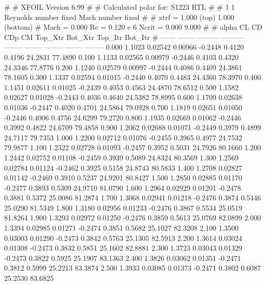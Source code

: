 #  
#       XFOIL         Version 6.99
#  
# Calculated polar for: S1223 RTL                                       
#  
# 1 1 Reynolds number fixed          Mach number fixed         
#  
# xtrf =   1.000 (top)        1.000 (bottom)  
# Mach =   0.000     Re =     0.120 e 6     Ncrit =   9.000  9.000
#  
#   alpha    CL        CD       CDp       CM     Top_Xtr  Bot_Xtr  Top_Itr  Bot_Itr
#  ------ -------- --------- --------- -------- -------- -------- -------- --------
   0.000   1.1023   0.02542   0.00966  -0.2448   0.4120   0.4196  24.2831  77.4890
   0.100   1.1133   0.02565   0.00979  -0.2446   0.4103   0.4320  24.3346  77.8776
   0.200   1.1240   0.02579   0.00997  -0.2444   0.4086   0.4409  24.3861  78.1605
   0.300   1.1337   0.02594   0.01015  -0.2440   0.4070   0.4483  24.4360  78.3970
   0.400   1.1451   0.02611   0.01025  -0.2439   0.4053   0.4563  24.4870  78.6512
   0.500   1.1582   0.02627   0.01028  -0.2443   0.4036   0.4640  24.5382  78.8995
   0.600   1.1709   0.02638   0.01036  -0.2447   0.4020   0.4701  24.5864  79.0928
   0.700   1.1819   0.02651   0.01050  -0.2446   0.4006   0.4756  24.6299  79.2720
   0.800   1.1935   0.02669   0.01062  -0.2446   0.3992   0.4822  24.6709  79.4858
   0.900   1.2062   0.02688   0.01071  -0.2449   0.3979   0.4899  24.7117  79.7353
   1.000   1.2200   0.02712   0.01076  -0.2455   0.3965   0.4977  24.7532  79.9877
   1.100   1.2322   0.02728   0.01093  -0.2457   0.3952   0.5031  24.7926  80.1660
   1.200   1.2442   0.02752   0.01108  -0.2459   0.3939   0.5089  24.8324  80.3569
   1.300   1.2569   0.02784   0.01124  -0.2462   0.3925   0.5158  24.8743  80.5833
   1.400   1.2708   0.02827   0.01142  -0.2469   0.3910   0.5237  24.9201  80.8427
   1.500   1.2850   0.02885   0.01170  -0.2477   0.3893   0.5309  24.9710  81.0790
   1.600   1.2964   0.02929   0.01201  -0.2478   0.3881   0.5372  25.0086  81.2874
   1.700   1.3068   0.02941   0.01218  -0.2476   0.3874   0.5446  25.0290  81.5349
   1.800   1.3180   0.02956   0.01233  -0.2476   0.3867   0.5534  25.0519  81.8264
   1.900   1.3293   0.02972   0.01250  -0.2476   0.3859   0.5613  25.0769  82.0899
   2.000   1.3394   0.02985   0.01271  -0.2474   0.3851   0.5682  25.1027  82.3208
   2.100   1.3500   0.03003   0.01290  -0.2473   0.3842   0.5763  25.1305  82.5913
   2.200   1.3614   0.03024   0.01308  -0.2473   0.3832   0.5851  25.1602  82.8881
   2.300   1.3723   0.03043   0.01329  -0.2473   0.3822   0.5925  25.1907  83.1363
   2.400   1.3826   0.03062   0.01351  -0.2471   0.3812   0.5999  25.2213  83.3874
   2.500   1.3933   0.03085   0.01373  -0.2471   0.3802   0.6087  25.2530  83.6825
